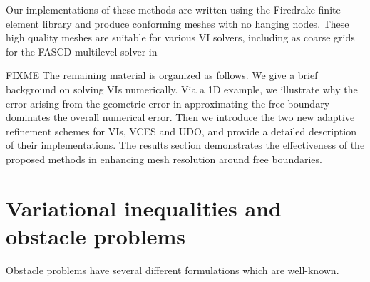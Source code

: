 \documentclass[]{interact}
\theoremstyle{plain}%
\theoremstyle{definition}
\theoremstyle{remark}
\begin{document}
Our implementations of these methods are written using the Firedrake finite element library and produce conforming meshes with no hanging nodes. These high quality meshes are suitable for various VI solvers, including as coarse grids for the FASCD multilevel solver in \citet{bueler_full_2023}

FIXME The remaining material is organized as follows.  We give a brief background on solving VIs numerically.  Via a 1D example, we illustrate why the error arising from the geometric error in approximating the free boundary dominates the overall numerical error.   Then we introduce the two new adaptive refinement schemes for VIs, VCES and UDO, and provide a detailed description of their implementations.  The results section demonstrates the effectiveness of the proposed methods in enhancing mesh resolution around free boundaries. 


\section{Variational inequalities and obstacle problems} \label{sec:vi}

Obstacle problems have several different formulations which are well-known.
\end{document}
